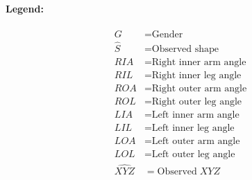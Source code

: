 \documentclass[11pt]{article}
\begin{document}
\begin{question}
{		\paragraph{Legend:}
		\begin{align*}
			G &= \text{Gender} \\
			\hat S &= \text{Observed shape} \\
			RIA &= \text{Right inner arm angle} \\
			RIL &= \text{Right inner leg angle} \\
			ROA &= \text{Right outer arm angle} \\
			ROL &= \text{Right outer leg angle} \\
			LIA &= \text{Left inner arm angle} \\
			LIL &= \text{Left inner leg angle} \\
			LOA &= \text{Left outer arm angle} \\
			LOL &= \text{Left outer leg angle} \\
			\widehat {XYZ} &= \text{Observed} \; XYZ
		\end{align*}
		}		  
\end{question}


\begin{question}

\end{question}
\end{document}
